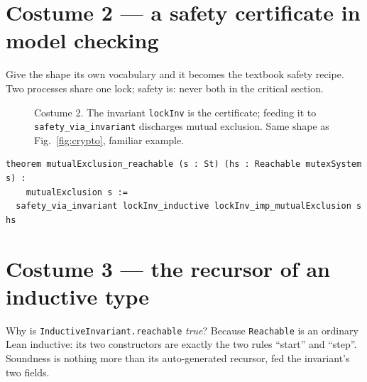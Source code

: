 \documentclass[runningheads]{llncs}
\begin{document}
\section{Costume 2 --- a safety certificate in model checking}

Give the shape its own vocabulary and it becomes the textbook safety recipe.
Two processes share one lock; safety is: never both in the critical section.

\begin{figure}[H]
\centering
{}
\caption{Costume 2. The invariant \texttt{lockInv} is the certificate; feeding it
to \texttt{safety\_via\_invariant} discharges mutual exclusion. Same shape as
Fig.~\ref{fig:crypto}, familiar example.}
\label{fig:mutex}
\end{figure}

\begin{lstlisting}[style=lean]
theorem mutualExclusion_reachable (s : St) (hs : Reachable mutexSystem s) :
    mutualExclusion s :=
  safety_via_invariant lockInv_inductive lockInv_imp_mutualExclusion s hs
\end{lstlisting}

\section{Costume 3 --- the recursor of an inductive type}

Why is \lstinline[style=lean]|InductiveInvariant.reachable| \emph{true}? Because
\lstinline[style=lean]|Reachable| is an ordinary Lean inductive: its two
constructors are exactly the two rules ``start'' and ``step''. Soundness is
nothing more than its auto-generated recursor, fed the invariant's two fields.
\end{document}
